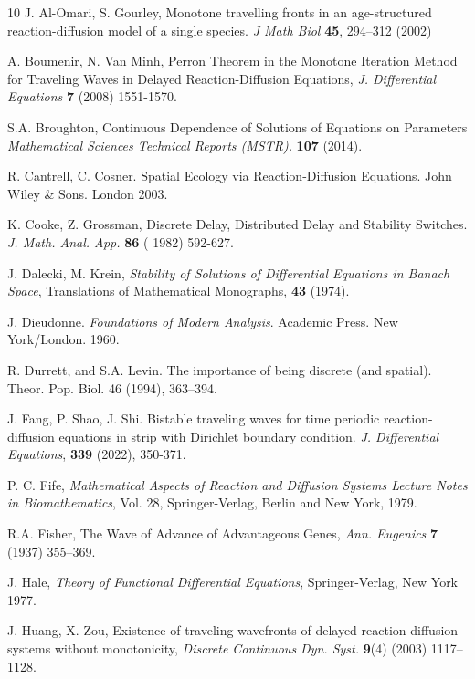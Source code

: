 \documentclass[12pt,letterpaper]{amsart}
\theoremstyle{definition}
\theoremstyle{remark}
\numberwithin{equation}{section}
\begin{document}

\begin{thebibliography}{10}
J. Al-Omari, S. Gourley, Monotone travelling fronts in an age-structured reaction-diffusion model of a single species.\textit{ J Math Biol} \textbf{45}, 294–312 (2002)

A. Boumenir, N. Van Minh, Perron Theorem in the Monotone Iteration Method for Traveling Waves in Delayed Reaction-Diffusion Equations, \textit{J. Differential Equations} \textbf{7} (2008) 1551-1570.

S.A. Broughton, Continuous Dependence of Solutions of Equations on Parameters 
\textit{Mathematical Sciences Technical Reports (MSTR).} \textbf{107}  (2014).

  R. Cantrell, C. Cosner.
Spatial Ecology via Reaction-Diffusion Equations. John Wiley \& Sons. London 2003.

 K. Cooke, Z. Grossman, Discrete Delay, Distributed Delay and Stability Switches. {\it J. Math. Anal. App.} {\bf 86} ( 1982) 592-627.

J. Dalecki,  M. Krein, \textit{Stability of Solutions of Differential Equations in Banach Space},
Translations of Mathematical Monographs, \textbf{43} (1974).

J. Dieudonne. {\it Foundations of Modern Analysis}. Academic Press. New York/London. 1960.


 R. Durrett,   and S.A. Levin. The importance of being discrete (and spatial). Theor. Pop. Biol.
46 (1994), 363–394.


J. Fang, P. Shao,  J. Shi.  Bistable traveling waves for time periodic reaction-diffusion equations in strip with Dirichlet boundary condition. {\it J. Differential Equations}, {\bf 339} (2022), 350-371.

P. C. Fife, \textit{Mathematical Aspects of Reaction and Diffusion Systems Lecture Notes in
Biomathematics}, Vol. 28, Springer-Verlag, Berlin and New York, 1979.

R.A. Fisher, The Wave of Advance of Advantageous Genes, \textit{Ann. Eugenics} \textbf{7} (1937) 355–369.

J. Hale, \textit{Theory of Functional Differential Equations}, Springer-Verlag, New York 1977.

J. Huang, X. Zou, Existence of traveling wavefronts of delayed reaction diffusion systems without monotonicity, \textit{Discrete Continuous Dyn. Syst.} \textbf{9}(4) (2003) 1117–1128.


\end{thebibliography}
\end{document}
